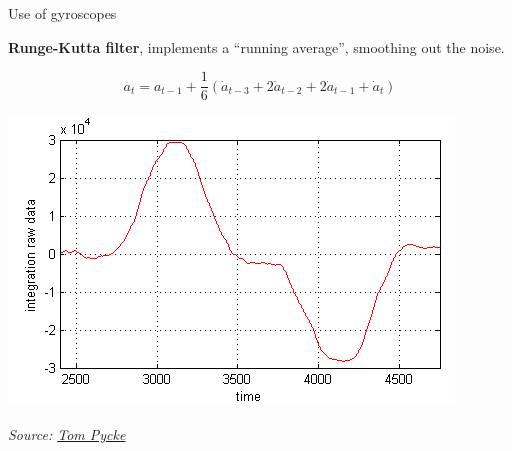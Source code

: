 \documentclass[compress]{beamer}
\newcommand{\source}[2]{{\tiny\it Source: \href{#1}{#2}}}
\begin{document}
\begin{frame}{Use of gyroscopes}
{        {\bf Runge-Kutta filter}, implements a ``running average'', smoothing out
        the noise.

        \[
            a_t = a_{t-1} + \frac{1}{6}(\dot{a}_{t-3} + 2\dot{a}_{t-2} + 2\dot{a}_{t-1} + \dot{a}_t)
        \]

        \begin{center}
            \includegraphics[width=0.6\linewidth]{mems-filtering}

            \source{http://tom.pycke.be/mav/70/gyroscope-to-roll-pitch-and-yaw}{Tom Pycke}
        \end{center}

    }
\end{frame}

\end{document}
